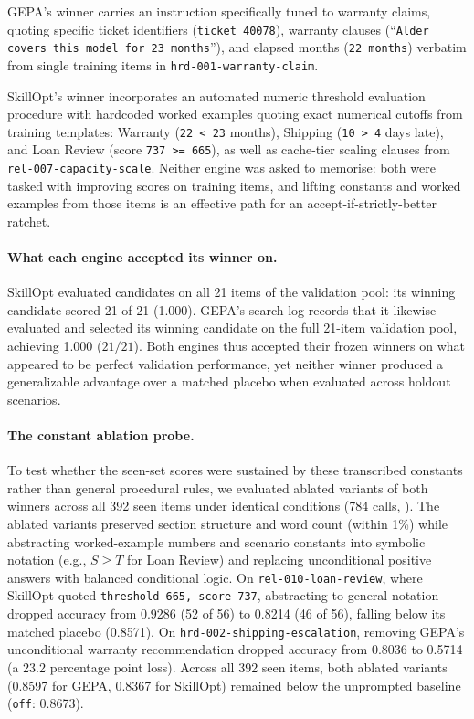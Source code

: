 GEPA's winner carries an instruction specifically tuned to warranty claims,
quoting specific ticket identifiers (\texttt{ticket 40078}), warranty clauses
(``\texttt{Alder covers this model for 23 months}''), and elapsed months
(\texttt{22 months}) verbatim from single training items in
\texttt{hrd-001-warranty-claim}.

SkillOpt's winner incorporates an automated numeric threshold evaluation
procedure with hardcoded worked examples quoting exact numerical cutoffs from
training templates: Warranty (\texttt{22 < 23} months), Shipping
(\texttt{10 > 4} days late), and Loan Review (score \texttt{737 >= 665}), as well
as cache-tier scaling clauses from \texttt{rel-007-capacity-scale}.
Neither engine was asked to memorise: both were tasked with improving scores on
training items, and lifting constants and worked examples from those items is an
effective path for an accept-if-strictly-better ratchet.

\paragraph{What each engine accepted its winner on.} SkillOpt evaluated candidates
on all 21 items of the validation pool: its winning candidate scored 21 of 21 (1.000).
GEPA's search log records that it likewise evaluated and selected its winning candidate
on the full 21-item validation pool, achieving 1.000 ($21/21$). Both engines thus
accepted their frozen winners on what appeared to be perfect validation performance,
yet neither winner produced a generalizable advantage over a matched placebo
when evaluated across holdout scenarios.

\paragraph{The constant ablation probe.} To test whether the seen-set scores were
sustained by these transcribed constants rather than general procedural rules, we
evaluated ablated variants of both winners across all 392 seen items under
identical conditions (784 calls, ). The ablated variants
preserved section structure and word count (within 1\%) while abstracting worked-example
numbers and scenario constants into symbolic notation (e.g., $S \ge T$ for Loan Review)
and replacing unconditional positive answers with balanced conditional logic.
On \texttt{rel-010-loan-review}, where SkillOpt quoted \texttt{threshold 665, score 737},
abstracting to general notation dropped accuracy from 0.9286 (52 of 56) to 0.8214
(46 of 56), falling below its matched placebo (0.8571).
On \texttt{hrd-002-shipping-escalation}, removing GEPA's unconditional warranty recommendation
dropped accuracy from 0.8036 to 0.5714 (a 23.2 percentage point loss). Across all 392 seen
items, both ablated variants (0.8597 for GEPA, 0.8367 for SkillOpt) remained below the
unprompted baseline (\texttt{off}: 0.8673).


